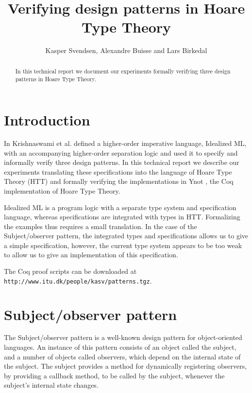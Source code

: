 \documentclass[a4paper,english]{article}
\title{Verifying design patterns in Hoare Type Theory}
\author{Kasper Svendsen, Alexandre Buisse and Lars Birkedal}
\begin{document}
\makefront 
\maketitle

\begin{abstract}
In this technical report we document our experiments formally verifying three
design patterns in Hoare Type Theory.
\end{abstract}

\section{Introduction}

In \cite{patterns, subobj} Krishnaswami et al. defined a higher-order imperative
language, Idealized ML, with an accompanying higher-order separation logic and
used it to specify and informally verify three design patterns. In this
technical report we describe our experiments translating these specifications
into the language of Hoare Type Theory (HTT) and formally verifying the
implementations in Ynot \cite{ynot-conf}, the Coq implementation of Hoare
Type Theory.

Idealized ML is a program logic with a separate type system and specification
language, whereas specifications are integrated with types in HTT. Formalizing
the examples thus requires a small translation. In the case of the
Subject/observer pattern, the integrated types and specifications allows us to
give a simple specification, however, the current type system appears to be
too weak to allow us to give an implementation of this specification.

The Coq proof scripts can be downloaded at
\texttt{http://www.itu.dk/people/kasv/patterns.tgz}.

\section{Subject/observer pattern}

The Subject/observer pattern is a well-known design pattern for object-oriented
languages. An instance of this pattern consists of an object called the
subject, and a number of objects called observers, which depend on the internal
state of the subject. The subject provides a method for dynamically registering
observers, by providing a callback method, to be called by the subject,
whenever the subject's internal state changes.
\end{document}
